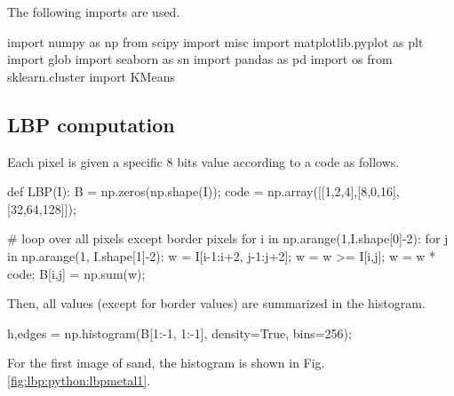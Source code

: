 \def\QRCODE{MASTER_mispa_TUT.IMG.lbp_pythonqrcode.png}
\def\QRPAGE{http://www.iptutorials.science/tree/master/MASTER_mispa/TUT.IMG.lbp/python}

The following imports are used.
\begin{python}
import numpy as np
from scipy import misc
import matplotlib.pyplot as plt
import glob
import seaborn as sn
import pandas as pd
import os
from sklearn.cluster import KMeans
\end{python}


\subsection{LBP computation}
Each pixel is given a specific 8 bits value according to a code as follows. 

\begin{python}
def LBP(I):
    B = np.zeros(np.shape(I));  
    code = np.array([[1,2,4],[8,0,16],[32,64,128]]);

    # loop over all pixels except border pixels
    for i in np.arange(1,I.shape[0]-2):
        for j in np.arange(1, I.shape[1]-2):
            w = I[i-1:i+2, j-1:j+2];
            w = w >= I[i,j];
            w = w * code;
            B[i,j] = np.sum(w);
\end{python}

Then, all values (except for border values) are summarized in the histogram.

\begin{python}
h,edges = np.histogram(B[1:-1, 1:-1], density=True, bins=256);
\end{python}

For the first image of sand, the histogram is shown in Fig.\ref{fig:lbp:python:lbpmetal1}.

